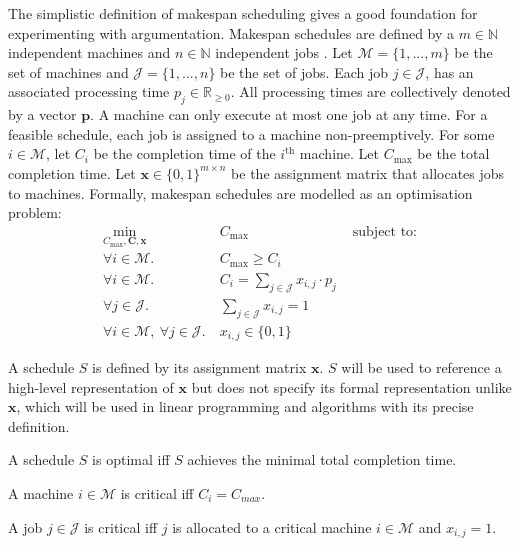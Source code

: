 The simplistic definition of makespan scheduling gives a good foundation for experimenting with argumentation. Makespan schedules are defined by a $m\in\mathbb{N}$ independent machines and $n\in\mathbb{N}$ independent jobs \cite{sa}. Let $\mathcal{M}=\{1,...,m\}$ be the set of machines and $\mathcal{J}=\{1,...,n\}$ be the set of jobs. Each job $j\in\mathcal{J}$, has an associated processing time $p_j\in\mathbb{R}_{\geq 0}$. All processing times are collectively denoted by a vector $\mathbf{p}$. A machine can only execute at most one job at any time. For a feasible schedule, each job is assigned to a machine non-preemptively. For some $i\in\mathcal{M}$, let $C_i$ be the completion time of the $i^\text{th}$ machine. Let $C_{\max}$ be the total completion time. Let $\mathbf{x}\in\{0,1\}^{m\times n}$ be the assignment matrix that allocates jobs to machines. Formally, makespan schedules are modelled as an optimisation problem:
\begin{align*}
	\min_{C_{\max},\mathbf{C},\mathbf{x}}\ &C_{\max}&\text{ subject to:}\\
	\forall i\in\mathcal{M}.\ &C_{\max}\geq C_i\\
	\forall i\in\mathcal{M}.\ &C_i=\sum_{j\in\mathcal{J}}x_{i,j}\cdot p_j\\
	\forall j\in\mathcal{J}.\ &\sum_{j\in\mathcal{J}}x_{i,j}=1\\
	\forall i\in\mathcal{M},\ \forall j\in\mathcal{J}.\ &x_{i,j}\in\{0,1\}
\end{align*}

\begin{definition}
	A schedule $S$ is defined by its assignment matrix $\mathbf{x}$. $S$ will be used to reference a high-level representation of $\mathbf{x}$ but does not specify its formal representation unlike $\mathbf{x}$, which will be used in linear programming and algorithms with its precise definition.
\end{definition}

\begin{definition}
	A schedule $S$ is optimal iff $S$ achieves the minimal total completion time.
\end{definition}


\begin{definition}
	A machine $i\in\mathcal{M}$ is critical iff $C_i=C_{max}$.
\end{definition}

\begin{definition}
	A job $j\in\mathcal{J}$ is critical iff $j$ is allocated to a critical machine $i\in\mathcal{M}$ and $x_{i,j}=1$.
\end{definition}


